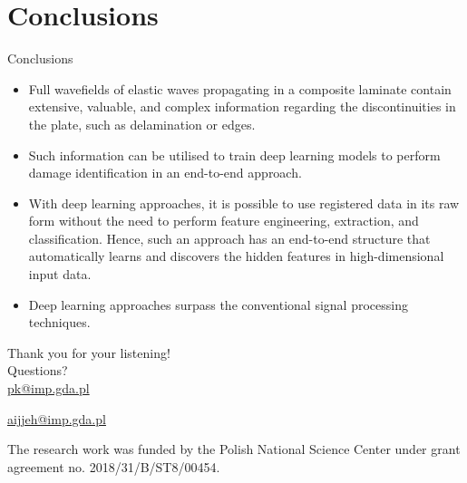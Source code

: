 \documentclass[10pt,aspectratio=169,dvipsnames]{beamer} %
\begin{document}
\section{Conclusions}
\begin{frame}{Conclusions}
	\footnotesize
	\begin{itemize}
		\item Full wavefields of elastic waves propagating in a composite laminate contain extensive, valuable, and complex information regarding the discontinuities in the plate, such as delamination or edges.
		\item Such information can be utilised to train deep learning models
		to perform damage identification in an end-to-end approach.
		\item With deep	learning approaches, it is possible to use registered data in its raw form without the need to perform feature engineering, extraction, and classification. 
		Hence, such an approach has an end-to-end structure that automatically learns and discovers the hidden features in high-dimensional input data.
		\item Deep learning approaches surpass the conventional signal processing techniques.
		
	\end{itemize}
\end{frame}

{
\begin{frame}[standout]
	Thank you for your listening!\\ \vspace{12pt}
	Questions?\\ \vspace{12pt}
	\url{pk@imp.gda.pl} 
	\par\medskip
	\url{aijjeh@imp.gda.pl}
	
 
\par\medskip
\par\medskip
\footnotesize
The research work was funded by the Polish National Science Center under grant agreement no. 2018/31/B/ST8/00454.
\end{frame}
}
\end{document}
